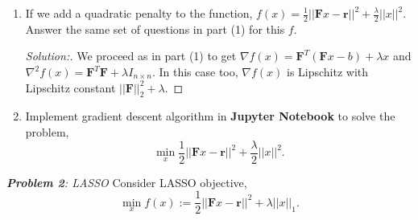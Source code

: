 \documentclass[a4paper,11pt,reqno]{amsart}
\theoremstyle{plain}
\theoremstyle{definition}
\theoremstyle{remark}
\numberwithin{equation}{section}
\begin{document}
\begin{enumerate}
\begin{proof}[Solution:]
	 And hence, the Hessian $ \nabla^2 f = \mathbf{F}^T \mathbf{F}$. It is also easy to see that $\nabla f$ is Lipschitz since 
	 \begin{align*}
	 ||\nabla f(x) - \nabla f(y)||_{2} &= ||\mathbf{F}^T\mathbf{F} (x - y) ||_{2} \mbox{ for any } x, y \in \mathbb{R}^n \notag \\
	 & \leq ||\mathbf{F}^T\mathbf{F}||_{2} ||x - y||_{2} \mbox{ (By definition of matrix 2-norm)}	 
	 \end{align*}
	 Thus, $\nabla f$ is Lipschitz continuous with Lipschitz constant $||\mathbf{F}^T\mathbf{F}||_{2} = ||\mathbf{F}||_2^2$.
	 
	 (Note to self: Recall that the singular values of a $m \times n$ matrix $X$ are the square roots of the eigenvalues of the $n \times n$ matrix X*X (where * stands for the transpose-conjugate matrix if it has complex coefficients, or the transpose if it has real coefficients). Thus, if $X$ is $n \times n$ real symmetric matrix with non-negative eigenvalues, then eigenvalues and singular values coincide, but it is not generally the case).
	\end{proof}
\vskip 16pt
\item If we add a quadratic penalty to the function, $f(x) = \frac{1}{2}||\mathbf{F}x - \mathbf{r}||^2 + \frac{\lambda}{2}||x||^2$. Answer the same set of questions in part (1) for this $f$.
\begin{proof}[Solution:] We proceed as in part (1) to get 
	$\nabla f(x) = \mathbf{F}^T(\mathbf{F} x - b) + \lambda x$ and $\nabla ^2 f(x) =  \mathbf{F}^T\mathbf{F} + \lambda I_{n \times n}$. In this case too,
	$\nabla f(x)$ is Lipschitz with Lipschitz constant $||\mathbf{F}||_2^2 + \lambda$.
	\end{proof}
\vskip 16pt
\item Implement gradient descent algorithm in \textbf{Jupyter Notebook} to solve the problem,
\[
\min_x \frac{1}{2}||\mathbf{F}x - \mathbf{r}||^2 + \frac{\lambda}{2}||x||^2.
\]
\end{enumerate}
\vskip 16pt \noindent
{\it \textbf{Problem 2}: LASSO}
\vskip 8pt
Consider LASSO objective,
\[
\min_x f(x) := \frac{1}{2}||\mathbf{F}x - \mathbf{r}||^2 + \lambda||x||_1.
\]
\end{document}

